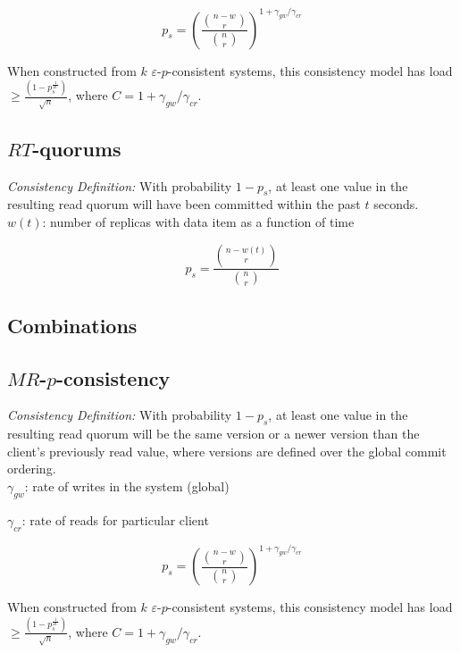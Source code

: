 \documentclass{vldb}
\begin{document}
\begin{equation}
p_s = \left(\frac{{n-w \choose r}}{{n \choose r}}\right)^{1+\gamma_{gw}/\gamma_{cr}}
\end{equation}

When constructed from $k$ $\varepsilon$-$p$-consistent systems, this
consistency model has load $\geq
\frac{(1-p_s^{\frac{1}{2C}})}{\sqrt{n}}$, where
$C=1+\gamma_{gw}/\gamma_{cr}$.

\subsection{$RT$-quorums}

\noindent\textit{Consistency Definition:} With probability $1-p_s$, at
least one value in the resulting read quorum will have been committed within the
past $t$ seconds.\\

\noindent$w(t)$: number of replicas with data item as a function of time

\begin{equation}
p_s = \frac{{n-w(t) \choose r}}{{n \choose r}}
\end{equation}

\subsection{Combinations}


\subsection{$MR$-$p$-consistency}

\noindent\textit{Consistency Definition:} With probability $1-p_s$, at
least one value in the resulting read quorum will be the same version or a newer
version than the client's previously read value, where versions are
defined over the global commit ordering.\\

\noindent $\gamma_{gw}$: rate of writes in the system (global)

\noindent $\gamma_{cr}$: rate of reads for particular client

\begin{equation}
p_s = \left(\frac{{n-w \choose r}}{{n \choose r}}\right)^{1+\gamma_{gw}/\gamma_{cr}}
\end{equation}

When constructed from $k$ $\varepsilon$-$p$-consistent systems, this
consistency model has load $\geq
\frac{(1-p_s^{\frac{1}{2C}})}{\sqrt{n}}$, where
$C=1+\gamma_{gw}/\gamma_{cr}$.
\end{document}
